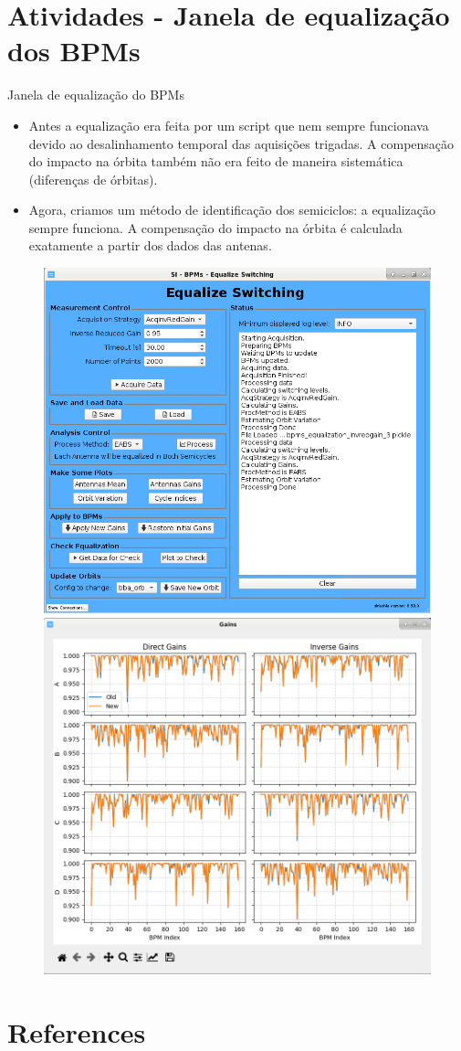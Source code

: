 \documentclass{beamer}					  %
\begin{document}
\section{Atividades - Janela de equalização dos BPMs}

\begin{frame}{Janela de equalização do BPMs}
    \begin{itemize}
        \scriptsize
        \item Antes a equalização era feita por um script que nem sempre funcionava devido ao desalinhamento temporal das aquisições trigadas. A compensação do impacto na órbita também não era feito de maneira sistemática (diferenças de órbitas).
        \item Agora, criamos um método de identificação dos semiciclos: a equalização sempre funciona. A compensação do impacto na órbita é calculada exatamente a partir dos dados das antenas.
    \end{itemize}
    \begin{figure}[H]
   		\centering
        \includegraphics[width=.48\textwidth]{
            2023-11-17/figures/bpms_equalization_window.png}
        \includegraphics[width=.48\textwidth]{2023-11-17/figures/bpms_gains.png}
        \label{fig:bpmseq_window}
    \end{figure}
\end{frame}

\section{References}
\end{document}
